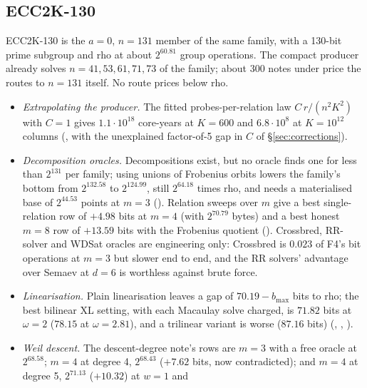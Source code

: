 \subsection{ECC2K-130}\label{sec:ecc2k130}

ECC2K-130 is the $a=0$, $n=131$ member of the same family, with a 130-bit
prime subgroup and rho at about $2^{60.81}$ group operations. The compact
producer already solves $n=41,53,61,71,73$ of the family; about 300 notes
under  price the routes to $n=131$ itself. No
route prices below rho.
\begin{itemize}
\item \emph{Extrapolating the producer.} The fitted probes-per-relation law
  $C\,r/(n^2K^2)$ with $C=1$ gives $1.1\cdot10^{18}$ core-years at $K=600$
  and $6.8\cdot10^{8}$ at $K=10^{12}$ columns
  (, with the unexplained
  factor-of-5 gap in $C$ of \S\ref{sec:corrections}).
\item \emph{Decomposition oracles.} Decompositions exist, but no oracle
  finds one for less than $2^{131}$ per family; using unions of Frobenius
  orbits lowers the family's bottom from $2^{132.58}$ to $2^{124.99}$, still
  $2^{64.18}$ times rho, and needs a materialised base of $2^{44.53}$ points
  at $m=3$
  ().
  Relation sweeps over $m$ give a best single-relation row of $+4.98$ bits
  at $m=4$ (with $2^{70.79}$ bytes) and a best honest $m=8$ row of $+13.59$
  bits with the Frobenius quotient
  ().
  Crossbred, RR-solver and WDSat oracles are engineering only: Crossbred is
  $0.023$ of F4's bit operations at $m=3$ but slower end to end, and the RR
  solvers' advantage over Semaev at $d=6$ is worthless against brute force.
\item \emph{Linearisation.} Plain linearisation leaves a gap of $70.19-b_{\max}$
  bits to rho; the best bilinear XL setting, with each Macaulay solve
  charged, is $71.82$ bits at $\omega=2$ ($78.15$ at $\omega=2.81$), and a
  trilinear variant is worse ($87.16$ bits)
  (,
  ,
  ).
\item \emph{Weil descent.} The descent-degree note's rows are $m=3$ with a
  free oracle at $2^{68.58}$; $m=4$ at degree 4, $2^{68.43}$ ($+7.62$ bits,
  now contradicted); and $m=4$ at degree 5, $2^{71.13}$ ($+10.32$) at $w=1$ and

\end{itemize}

